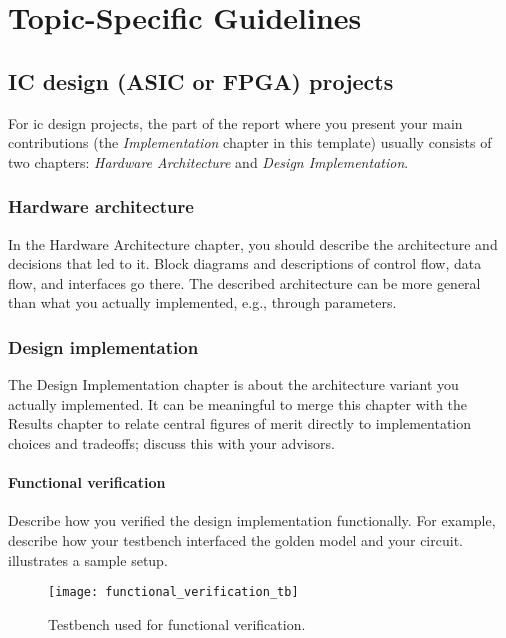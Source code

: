 \chapter{Topic-Specific Guidelines}
\label{app:topic-specific_guidelines}

\section{IC design (ASIC or FPGA) projects}

    For \gls{ic} design projects, the part of the report where you present your main contributions (the \textsl{Implementation} chapter in this template) usually consists of two chapters: \textsl{Hardware Architecture} and \textsl{Design Implementation}.

  \subsection{Hardware architecture}

    In the Hardware Architecture chapter, you should describe the architecture and decisions that led to it.
    Block diagrams and descriptions of control flow, data flow, and interfaces go there.
    The described architecture can be more general than what you actually implemented, e.g., through parameters.

  \subsection{Design implementation}

    The Design Implementation chapter is about the architecture variant you actually implemented.
    It can be meaningful to merge this chapter with the Results chapter to relate central figures of merit directly to implementation choices and tradeoffs; discuss this with your advisors.

    \subsubsection{Functional verification}

      Describe how you verified the design implementation functionally.
      For example, describe how your testbench interfaced the golden model and your circuit.
       illustrates a sample setup.

      \begin{figure}
        \centering
        \texttt{[image: functional\_verification\_tb]}
        \caption{Testbench used for functional verification.}%
        \label{fig:functional_verification_tb}
      \end{figure}

